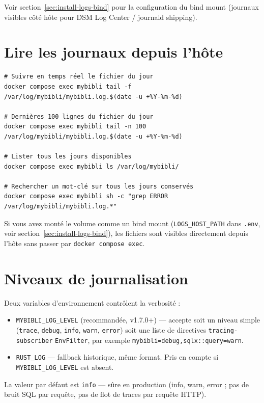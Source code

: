 Voir section~\ref{sec:install-logs-bind} pour la configuration du
bind mount (journaux visibles côté hôte pour DSM Log Center /
journald shipping).

\section{Lire les journaux depuis l'hôte}

\begin{lstlisting}
# Suivre en temps réel le fichier du jour
docker compose exec mybibli tail -f /var/log/mybibli/mybibli.log.$(date -u +%Y-%m-%d)

# Dernières 100 lignes du fichier du jour
docker compose exec mybibli tail -n 100 /var/log/mybibli/mybibli.log.$(date -u +%Y-%m-%d)

# Lister tous les jours disponibles
docker compose exec mybibli ls /var/log/mybibli/

# Rechercher un mot-clé sur tous les jours conservés
docker compose exec mybibli sh -c "grep ERROR /var/log/mybibli/mybibli.log.*"
\end{lstlisting}

Si vous avez monté le volume comme un bind mount
(\texttt{LOGS\_HOST\_PATH} dans \texttt{.env}, voir
section~\ref{sec:install-logs-bind}), les fichiers sont visibles
directement depuis l'hôte sans passer par \texttt{docker compose
exec}.

\section{Niveaux de journalisation}
\label{sec:log-levels}

Deux variables d'environnement contrôlent la verbosité :

\begin{itemize}
  \item \texttt{MYBIBLI\_LOG\_LEVEL} (recommandée, v1.7.0+) —
        accepte soit un niveau simple (\texttt{trace}, \texttt{debug},
        \texttt{info}, \texttt{warn}, \texttt{error}) soit une liste
        de directives \texttt{tracing-subscriber}
        \texttt{EnvFilter}, par exemple
        \texttt{mybibli=debug,sqlx::query=warn}.
  \item \texttt{RUST\_LOG} — fallback historique, même format.
        Pris en compte si \texttt{MYBIBLI\_LOG\_LEVEL} est absent.
\end{itemize}

La valeur par défaut est \texttt{info} — sûre en production (info,
warn, error ; pas de bruit SQL par requête, pas de flot de traces
par requête HTTP).

